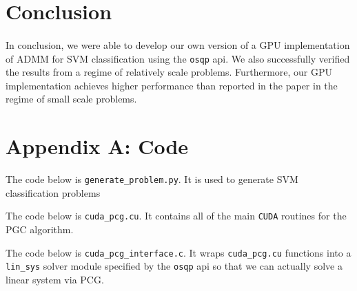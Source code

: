 \documentclass[justified,nobib]{tufte-handout}
\begin{document}
\begin{fullwidth}
\section{Conclusion}

\paragraph{} In conclusion, we were able to develop our own version of a GPU implementation of ADMM for SVM classification using the \texttt{osqp} api. We also successfully verified the results from \cite{cuosqp} a regime of relatively scale problems. Furthermore, our GPU implementation achieves higher performance than reported in the paper in the regime of small scale problems. 
\clearpage
{}

\clearpage
\section{Appendix A: Code}
The code below is \texttt{generate\_problem.py}. It is used to generate SVM classification problems 

\clearpage
The code below is \texttt{cuda\_pcg.cu}. It contains all of the main \texttt{CUDA} routines for the PGC algorithm.

\clearpage
The code below is \texttt{cuda\_pcg\_interface.c}. It wraps \texttt{cuda\_pcg.cu} functions into a \texttt{lin\_sys} solver module specified by the \texttt{osqp} api so that we can actually solve a linear system via PCG.


\end{fullwidth}
\end{document}

